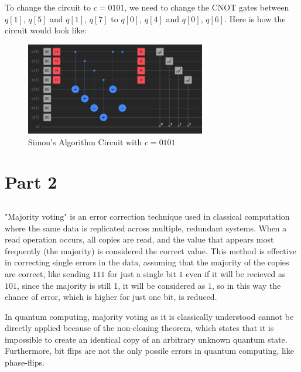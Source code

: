 \documentclass[12pt]{article}
\begin{document}
To change the circuit to $ c = 0101 $, we need to change the CNOT gates between $q[1]$, $q[5]$ and $q[1]$, $q[7]$ to $q[0]$, $q[4]$ and $q[0]$, $q[6]$. Here is how the circuit would look like:

\begin{figure}[H]
    \centering
    \includegraphics[width=0.7\textwidth]{0101.png}
    \caption{Simon's Algorithm Circuit with $ c = 0101 $}
\end{figure}

\section*{Part 2}


\subsection*{}

"Majority voting" is an error correction technique used in classical computation where the same data is replicated across multiple, redundant systems. When a read operation occurs, all copies are read, and the value that appears most frequently (the majority) is considered the correct value. This method is effective in correcting single errors in the data, assuming that the majority of the copies are correct, like sending $111$ for just a single bit $1$ even if it will be recieved as $101$, since the majority is still 1, it will be considered as $1$, so in this way the chance of error, which is higher for just one bit, is reduced.

In quantum computing, majority voting as it is classically understood cannot be directly applied because of the non-cloning theorem, which states that it is impossible to create an identical copy of an arbitrary unknown quantum state. Furthermore, bit flips are not the only possile errors in quantum computing, like phase-flips. 
\end{document}
